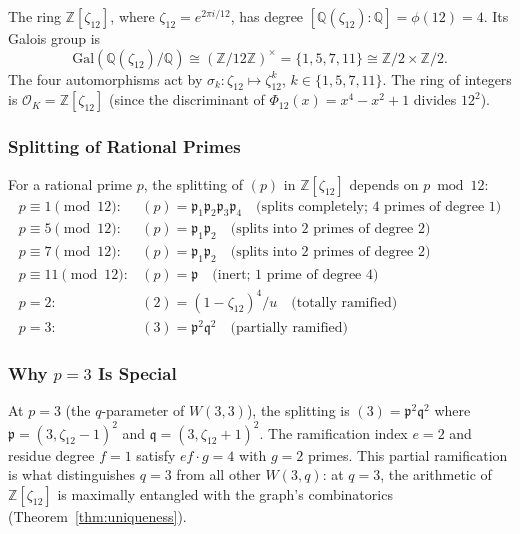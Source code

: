 The ring $\mathbb{Z}[\zeta_{12}]$, where $\zeta_{12}=e^{2\pi i/12}$,
has degree $[\mathbb{Q}(\zeta_{12}):\mathbb{Q}]=\phi(12)=4$.
Its Galois group is
\begin{equation}
  \mathrm{Gal}(\mathbb{Q}(\zeta_{12})/\mathbb{Q})
  \cong (\mathbb{Z}/12\mathbb{Z})^\times
  = \{1,5,7,11\}
  \cong \mathbb{Z}/2\times\mathbb{Z}/2.
  \label{eq:galois12}
\end{equation}
The four automorphisms act by $\sigma_k: \zeta_{12}\mapsto\zeta_{12}^k$,
$k\in\{1,5,7,11\}$. The ring of integers is $\mathcal{O}_K=\mathbb{Z}[\zeta_{12}]$
(since the discriminant of $\Phi_{12}(x)=x^4-x^2+1$ divides $12^2$).

\subsubsection{Splitting of Rational Primes}

For a rational prime $p$, the splitting of $(p)$ in $\mathbb{Z}[\zeta_{12}]$
depends on $p\bmod 12$:
\begin{equation}
\begin{array}{ll}
p\equiv 1\pmod{12}: & (p)=\mathfrak{p}_1\mathfrak{p}_2\mathfrak{p}_3\mathfrak{p}_4
  \quad\text{(splits completely; 4 primes of degree 1)}\\
p\equiv 5\pmod{12}: & (p)=\mathfrak{p}_1\mathfrak{p}_2
  \quad\text{(splits into 2 primes of degree 2)}\\
p\equiv 7\pmod{12}: & (p)=\mathfrak{p}_1\mathfrak{p}_2
  \quad\text{(splits into 2 primes of degree 2)}\\
p\equiv 11\pmod{12}: & (p)=\mathfrak{p}
  \quad\text{(inert; 1 prime of degree 4)}\\
p=2: & (2)=(1-\zeta_{12})^4/u\quad\text{(totally ramified)}\\
p=3: & (3)=\mathfrak{p}^2\mathfrak{q}^2\quad\text{(partially ramified)}
\end{array}
\label{eq:splitting}
\end{equation}

\subsubsection{Why $p=3$ Is Special}

At $p=3$ (the $q$-parameter of $W(3,3)$), the splitting is
$(3)=\mathfrak{p}^2\mathfrak{q}^2$ where
$\mathfrak{p}=(3,\zeta_{12}-1)^2$ and $\mathfrak{q}=(3,\zeta_{12}+1)^2$.
The ramification index $e=2$ and residue degree $f=1$ satisfy $ef\cdot g=4$
with $g=2$ primes. This partial ramification is what distinguishes $q=3$
from all other $W(3,q)$: at $q=3$, the arithmetic of $\mathbb{Z}[\zeta_{12}]$
is maximally entangled with the graph's combinatorics (Theorem~\ref{thm:uniqueness}).

